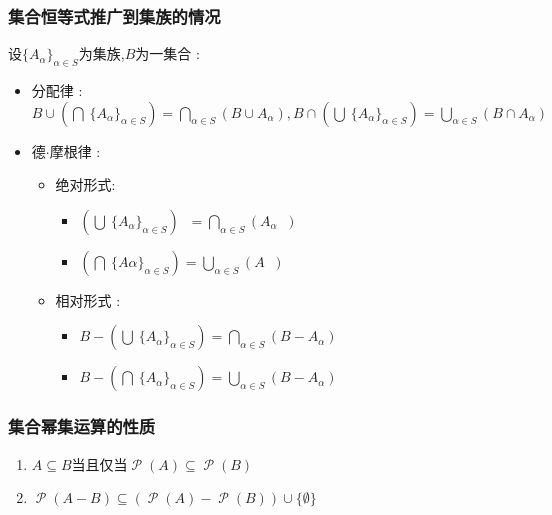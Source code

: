 \documentclass[UTF8,12pt]{ctexbook}
\newcommand{\updownUnion}[2]{\bigcup\limits_{#2}^{#1}}
\newcommand{\updownIntersection}[2]{\bigcap\limits_{#2}^{#1}}
\newcommand{\powerSetOf}[1]{\powerSet (#1)}
\DeclareMathOperator{\powerSet}{\mathcal{P}}
\DeclareMathOperator{\unionSet}{\cup}
\DeclareMathOperator{\intersectionSet}{\cap}
\DeclareMathOperator{\absoluteCompletementSet}{^\complement}
\begin{document}
{{{{\subsubsection{集合恒等式推广到集族的情况}{
设$\{A_\alpha\}_{\alpha \in S}$为集族,$B$为一集合 :

\begin{itemize}
  \item 分配律 : $B \unionSet (\updownIntersection{~}{~}\{A_\alpha\}_{\alpha \in S}) = \updownIntersection{~}{\alpha \in S}(B \unionSet A_\alpha),B \intersectionSet (\updownUnion{~}{~}\{A_\alpha\}_{\alpha \in S}) = \updownUnion{~}{\alpha \in S}(B \intersectionSet A_\alpha)$
  \item 德$\cdot$摩根律 : \begin{itemize}
          \item 绝对形式: \begin{itemize}
                  \item $(\updownUnion{~}{~}\{A_\alpha\}_{\alpha \in S})\absoluteCompletementSet = \updownIntersection{~}{\alpha \in S}(A_\alpha\absoluteCompletementSet)$
                  \item$(\updownIntersection{~}{~}\{A\alpha\}_{\alpha \in S}) = \updownUnion{~}{\alpha \in S}(A\absoluteCompletementSet)$
                \end{itemize}
          \item 相对形式 : \begin{itemize}
                  \item $B - (\updownUnion{~}{~}\{A_\alpha\}_{\alpha \in S}) = \updownIntersection{~}{\alpha \in S}(B - A_\alpha)$
                  \item $B - (\updownIntersection{~}{~}\{A_\alpha\}_{\alpha \in S}) = \updownUnion{~}{\alpha \in S}(B - A_\alpha)$
                \end{itemize}
        \end{itemize}
\end{itemize}
}%

\subsubsection{集合幂集运算的性质}{
  \begin{enumerate}
    \item $A \subseteq B$当且仅当$\powerSetOf{A} \subseteq \powerSetOf{B}$
    \item $\powerSetOf{A - B} \subseteq (\powerSetOf{A} - \powerSetOf{B}) \unionSet \{\emptyset\}$
  \end{enumerate}
}%

}}}}
\end{document}
